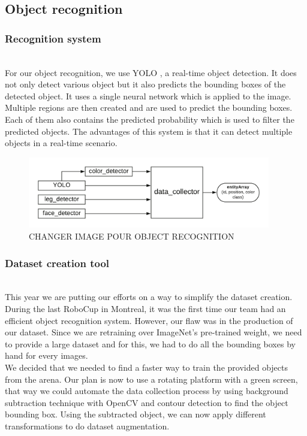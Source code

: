 \documentclass[runningheads,a4paper]{llncs}
\begin{document}
\subsection{Object recognition}
\subsubsection{Recognition system}
\hfill\\

For our object recognition, we use YOLO \cite{yolo}, a real-time object detection. It does not only detect various object but it also predicts the bounding boxes of the detected object. It uses a single neural network which is applied to the image. Multiple regions are then created and are used to predict the bounding boxes. Each of them also contains the predicted probability which is used to filter the predicted objects. The advantages of this system is that it can detect multiple objects in a real-time scenario.\\

\begin{figure}
  \centering
  \includegraphics[width=300pt]{images/wm_data_collector.png}
  \caption{ CHANGER IMAGE POUR OBJECT RECOGNITION}
\end{figure} 

\subsubsection{Dataset creation tool}
\hfill\\

This year we are putting our efforts on a way to simplify the dataset creation. During the last RoboCup in Montreal, it was the first time our team had an efficient object recognition system. However, our flaw was in the production of our dataset. Since we are retraining over ImageNet's pre-trained weight, we need to provide a large dataset and for this, we had to do all the bounding boxes by hand for every images.\\
 
We decided that we needed to find a faster way to train the provided objects from the arena. Our plan is now to use a rotating platform with a green screen, that way we could automate the data collection process by using background subtraction technique with OpenCV and contour detection to find the object bounding box. Using the subtracted object, we can now apply different transformations to do dataset augmentation. \\
\end{document}

